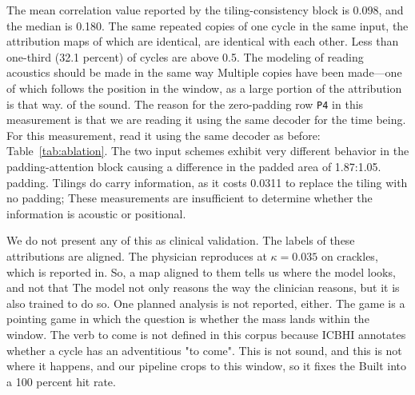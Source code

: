 \documentclass[journal,onecolumn]{IEEEtran}
\begin{document}
The mean correlation value reported by the tiling-consistency block is 0.098, and the median is 0.180.
The same repeated copies of one cycle in the same input, the attribution maps of which are identical, are identical with each other.
Less than one-third (32.1 percent) of cycles are above 0.5. The modeling of reading acoustics should be made in the same way
Multiple copies have been made—one of which follows the position in the window, as a large portion of the attribution is that way.
of the sound. The reason for the zero-padding row \texttt{P4} in this measurement is that we are reading it using the same decoder for the time being. For this measurement, read it using the same decoder as before:
Table~\ref{tab:ablation}. The two input schemes exhibit very different behavior in the padding-attention block 
causing a difference in the padded area of 1.87:1.05.
padding. Tilings do carry information, as it costs 0.0311 to replace the tiling with no padding;
These measurements are insufficient to determine whether the information is acoustic or positional.

We do not present any of this as clinical validation. The labels of these attributions are aligned.
The physician reproduces at $\kappa = 0.035$ on crackles, which is reported in.
So, a map aligned to them tells us where the model looks, and not that
The model not only reasons the way the clinician reasons, but it is also trained to do so. One planned analysis is not reported, either.
The game is a pointing game in which the question is whether the mass lands within the window.
The verb to come is not defined in this corpus because ICBHI annotates whether a cycle has an adventitious "to come".
This is not sound, and this is not where it happens, and our pipeline crops to this window, so it fixes the
Built into a 100 percent hit rate.
\end{document}
